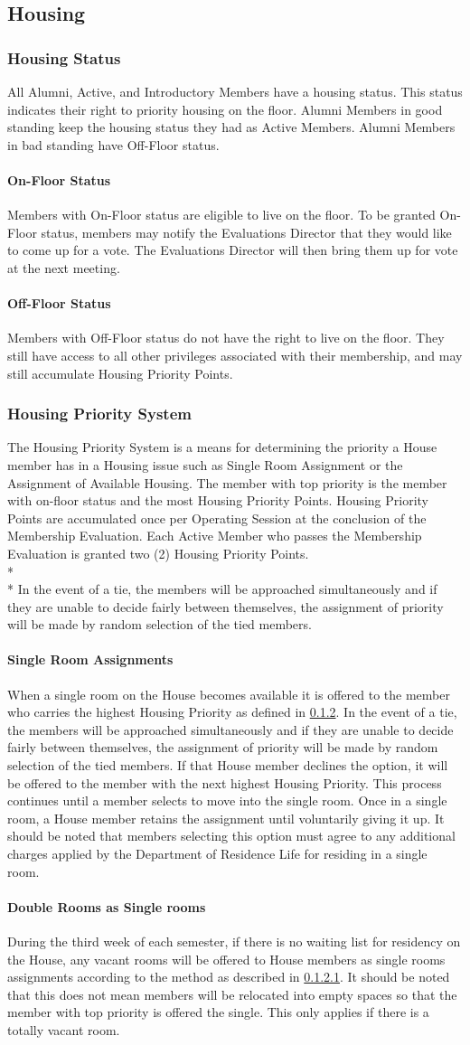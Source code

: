 \documentclass{article}
\newcommand{\asection}[1]{\subsection{#1} \label{#1}}
\newcommand{\asubsection}[1]{\subsubsection{#1} \label{#1}}
\newcommand{\asubsubsection}[1]{\paragraph{#1} \label{#1}}
\begin{document}
\asection{Housing}

\asubsection{Housing Status}
All Alumni, Active, and Introductory Members have a housing status.
This status indicates their right to priority housing on the floor.
Alumni Members in good standing keep the housing status they had as Active Members.
Alumni Members in bad standing have Off-Floor status.
\asubsubsection{On-Floor Status}
Members with On-Floor status are eligible to live on the floor.
To be granted On-Floor status, members may notify the Evaluations Director that they would like to come up for a vote.
The Evaluations Director will then bring them up for vote at the next meeting.
\asubsubsection{Off-Floor Status}
Members with Off-Floor status do not have the right to live on the floor.
They still have access to all other privileges associated with their membership, and may still accumulate Housing Priority Points.

\asubsection{Housing Priority System}
The Housing Priority System is a means for determining the priority a House member has in a Housing issue such as Single Room Assignment or the Assignment of Available Housing.
The member with top priority is the member with on-floor status and the most Housing Priority Points.
Housing Priority Points are accumulated once per Operating Session at the conclusion of the Membership Evaluation. Each Active Member who passes the Membership Evaluation is granted two (2) Housing Priority Points.
\\* \\*
In the event of a tie, the members will be approached simultaneously and if they are unable to decide fairly between themselves, the assignment of priority will be made by random selection of the tied members.
\asubsubsection{Single Room Assignments}
When a single room on the House becomes available it is offered to the member who carries the highest Housing Priority as defined in \ref{Housing Priority System}.
In the event of a tie, the members will be approached simultaneously and if they are unable to decide fairly between themselves, the assignment of priority will be made by random selection of the tied members.
If that House member declines the option, it will be offered to the member with the next highest Housing Priority.
This process continues until a member selects to move into the single room.
Once in a single room, a House member retains the assignment until voluntarily giving it up.
It should be noted that members selecting this option must agree to any additional charges applied by the Department of Residence Life for residing in a single room.
\asubsubsection{Double Rooms as Single rooms}
During the third week of each semester, if there is no waiting list for residency on the House, any vacant rooms will be offered to House members as single rooms assignments according to the method as described in \ref{Single Room Assignments}.
It should be noted that this does not mean members will be relocated into empty spaces so that the member with top priority is offered the single.
This only applies if there is a totally vacant room.
\end{document}
